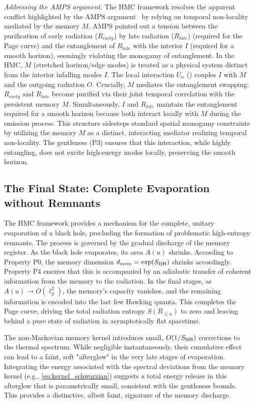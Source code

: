 \documentclass[a4paper,11pt]{article}
\newcommand{\eg}{e.g.\xspace}
\newcommand{\HMC}{\textsc{HMC}\xspace}
\theoremstyle{plain}
\theoremstyle{definition}
\theoremstyle{remark}
\begin{document}
\textit{Addressing the AMPS argument.} The \HMC{} framework resolves the apparent conflict highlighted by the AMPS argument~\cite{AMPS:2013} by relying on temporal non-locality mediated by the memory $M$. AMPS pointed out a tension between the purification of early radiation ($R_{early}$) by late radiation ($R_{late}$) (required for the Page curve) and the entanglement of $R_{late}$ with the interior $I$ (required for a smooth horizon), seemingly violating the monogamy of entanglement. In the \HMC{}, $M$ (stretched horizon/edge modes) is treated as a physical system distinct from the interior infalling modes $I$. The local interaction $U_n$ () couples $I$ with $M$ and the outgoing radiation $O$. Crucially, $M$ mediates the entanglement swapping: $R_{early}$ and $R_{late}$ become purified via their joint temporal correlation with the persistent memory $M$. Simultaneously, $I$ and $R_{late}$ maintain the entanglement required for a smooth horizon because both interact locally with $M$ during the emission process. This structure sidesteps standard spatial monogamy constraints by utilizing the memory $M$ as a distinct, interacting mediator realizing temporal non-locality. The gentleness (P3) ensures that this interaction, while highly entangling, does not excite high-energy modes locally, preserving the smooth horizon.

\subsection{The Final State: Complete Evaporation without Remnants}
\label{sec:end_state}
The \HMC{} framework provides a mechanism for the complete, unitary evaporation of a black hole, precluding the formation of problematic high-entropy remnants. The process is governed by the gradual discharge of the memory register.
As the black hole evaporates, its area $A(u)$ shrinks. According to Property P0, the memory dimension $d_{\rm mem} = \exp(S_{\rm BH})$ shrinks accordingly. Property P4 ensures that this is accompanied by an adiabatic transfer of coherent information from the memory to the radiation. In the final stages, as $A(u)\to O(\ell_p^2)$, the memory's capacity vanishes, and the remaining information is encoded into the last few Hawking quanta. This completes the Page curve, driving the total radiation entropy $S(R_{\le n})$ to zero and leaving behind a pure state of radiation in asymptotically flat spacetime.

The non-Markovian memory kernel introduces small, $O(1/S_{\rm BH})$ corrections to the thermal spectrum. While negligible instantaneously, their cumulative effect can lead to a faint, soft "afterglow" in the very late stages of evaporation. Integrating the energy associated with the spectral deviations from the memory kernel (\eg, \eqref{eq:kernel_schwarzian}) suggests a total energy release in this afterglow that is parametrically small, consistent with the gentleness bounds. This provides a distinctive, albeit faint, signature of the memory discharge.
\end{document}
